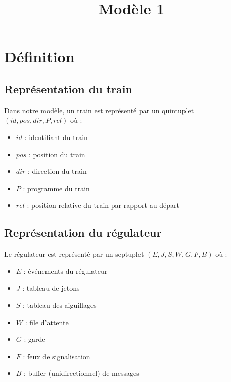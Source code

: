 \documentclass[12pt]{article}
\title{Modèle 1}
\author{}
\begin{document}
\newcommand\concat[2]{#1;#2}
\newcommand\train[5]{(#1, #2, #3, #4, #5)} %
\newcommand\trainfull[6]{\Gamma \cup \train{#1}{#2}{#3}{#4}{#5}{#6}} 
\newcommand\reg[7]{(#1, #2, #3, #4, #5, #6, #7)} %

\newcommand\maj[2]{#1 \gets #2} %
\newcommand\majtab[3]{#1[#2] \gets #3}
\newcommand\supprdict[2]{#1' \gets suppr(#1, #2)} %
\newcommand\bracket[2]{
    \begin{math}
        \biggl\{
        \begin{array}{l}
            #1\\
            #2
        \end{array}
    \end{math}
}



\maketitle


\section{Définition}

\subsection{Représentation du train}
Dans notre modèle, un train est représenté par un quintuplet $(id, pos, dir, P, rel)$ où :
\begin{itemize}
    \item $id$ : identifiant du train
    \item $pos$ : position du train 
    \item $dir$ : direction du train
    \item $P$ : programme du train
    \item $rel$ : position relative du train par rapport au départ
\end{itemize}

\subsection{Représentation du régulateur}
Le régulateur est représenté par un septuplet $(E, J, S, W, G, F, B)$ où :
\begin{itemize}
    \item $E$ : événements du régulateur
    \item $J$ : tableau de jetons
    \item $S$ : tableau des aiguillages
    \item $W$ : file d'attente
    \item $G$ : garde
    \item $F$ : feux de signalisation
    \item $B$ : buffer (unidirectionnel) de messages
\end{itemize}
\end{document}

